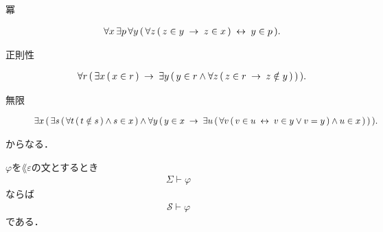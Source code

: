 \begin{description}
		\item[冪] 
			\begin{align}
				\forall x\, \exists p\, \forall y\, 
				(\, \forall z\, (\, z \in y \hspace{0.25em}\rightarrow\hspace{0.25em} z \in x\, ) \hspace{0.25em}\leftrightarrow\hspace{0.25em} y \in p\, ).
			\end{align}
			
		\item[正則性] 
			\begin{align}
				\forall r\, (\, \exists x\, (\, x \in r\, ) \hspace{0.25em}\rightarrow\hspace{0.25em}
				\exists y\, (\, y \in r \wedge \forall z\, (\, z \in r \hspace{0.25em}\rightarrow\hspace{0.25em}
				z \notin y\, )\, )\, ).
			\end{align}
			
		\item[無限] 
			\begin{align}
				\exists x\, (\, 
				\exists s\, (\, \forall t\, (\, t \notin s\, ) \wedge s \in x\, ) 
				\wedge \forall y\, (\, 
				y \in x \hspace{0.25em}\rightarrow\hspace{0.25em} \exists u\, (\, 
				\forall v\, (\, v \in u \hspace{0.25em}\leftrightarrow\hspace{0.25em} v \in y \vee v = y\, )
				\wedge u \in x\, )\, )\, ).
			\end{align}
	\end{description}
	からなる．
	
	
	\begin{screen}
		\begin{metathm}
		\label{metathm:Henkin_expansion_3}
			$\varphi$を$\lang{\varepsilon}$の文とするとき
			\begin{align}
				\Sigma \vdash \varphi
			\end{align}
			ならば
			\begin{align}
				\mathscr{S} \vdash \varphi
			\end{align}
			である．
		\end{metathm}
	\end{screen}
	

